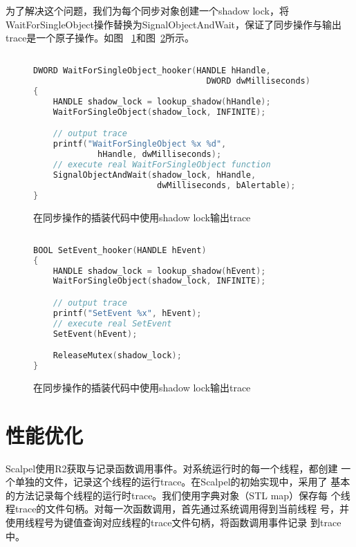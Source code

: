 为了解决这个问题，我们为每个同步对象创建一个shadow lock，将
WaitForSingleObject操作替换为SignalObjectAndWait，保证了同步操作与输出
trace是一个原子操作。如图
~\ref{fig:trace_shadowlock1}和图~\ref{fig:trace_shadowlock2}所示。

\begin{figure}
\centering
\begin{lstlisting}[language=C++, basicstyle=\small]

DWORD WaitForSingleObject_hooker(HANDLE hHandle, 
                                   DWORD dwMilliseconds)
{
    HANDLE shadow_lock = lookup_shadow(hHandle);
    WaitForSingleObject(shadow_lock, INFINITE);

    // output trace
    printf("WaitForSingleObject %x %d", 
             hHandle, dwMilliseconds);
    // execute real WaitForSingleObject function
    SignalObjectAndWait(shadow_lock, hHandle, 
                         dwMilliseconds, bAlertable);
}
\end{lstlisting}
\caption{在同步操作的插装代码中使用shadow lock输出trace}
\label{fig:trace_shadowlock1}
\end{figure}

\begin{figure}
\centering
\begin{lstlisting}[language=C++, basicstyle=\small]

BOOL SetEvent_hooker(HANDLE hEvent)
{
    HANDLE shadow_lock = lookup_shadow(hEvent);
    WaitForSingleObject(shadow_lock, INFINITE);

    // output trace
    printf("SetEvent %x", hEvent);
    // execute real SetEvent
    SetEvent(hEvent);

    ReleaseMutex(shadow_lock);
}

\end{lstlisting}
\caption{在同步操作的插装代码中使用shadow lock输出trace}
\label{fig:trace_shadowlock2}
\end{figure}

\section{性能优化}
\label{sec:scp:optimization}

Scalpel使用R2获取与记录函数调用事件。对系统运行时的每一个线程，都创建
一个单独的文件，记录这个线程的运行trace。在Scalpel的初始实现中，采用了
基本的方法记录每个线程的运行时trace。我们使用字典对象（STL map）保存每
个线程trace的文件句柄。对每一次函数调用，首先通过系统调用得到当前线程
号，并使用线程号为键值查询对应线程的trace文件句柄，将函数调用事件记录
到trace中。

